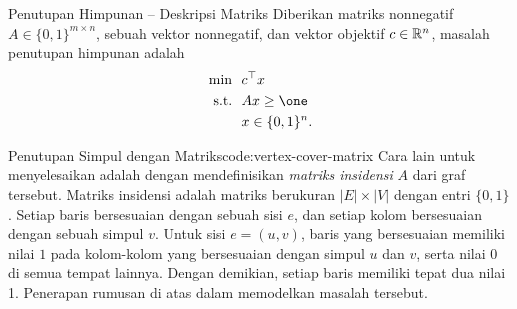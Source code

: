 

%

\begin{general}{Penutupan Himpunan -- Deskripsi Matriks}{\npcomplete}
\label{general:set-covering-alternate}
Diberikan matriks nonnegatif $A \in \{0,1\}^{m \times n}$, sebuah vektor nonnegatif, dan vektor objektif $c \in {\mathbb{R}}^n$, masalah penutupan himpunan adalah
\begin{equation}
\begin{split}
\min \ \ & c^\top x\\
\text{s.t.} \ \ & Ax \geq \one \\
& x \in \{0,1\}^n.
\end{split}
\end{equation}
\end{general}
\begin{examplewithoutcode}{Penutupan Simpul dengan Matriks}{code:vertex-cover-matrix}
Cara lain untuk menyelesaikan  adalah dengan mendefinisikan \emph{matriks insidensi} $A$ dari graf tersebut. Matriks insidensi adalah matriks berukuran $|E| \times |V|$ dengan entri $\{0,1\}$. Setiap baris bersesuaian dengan sebuah sisi $e$, dan setiap kolom bersesuaian dengan sebuah simpul $v$. Untuk sisi $e = (u,v)$, baris yang bersesuaian memiliki nilai $1$ pada kolom-kolom yang bersesuaian dengan simpul $u$ dan $v$, serta nilai 0 di semua tempat lainnya. Dengan demikian, setiap baris memiliki tepat dua nilai 1. Penerapan rumusan di atas dalam  memodelkan masalah tersebut.
\end{examplewithoutcode}




%
